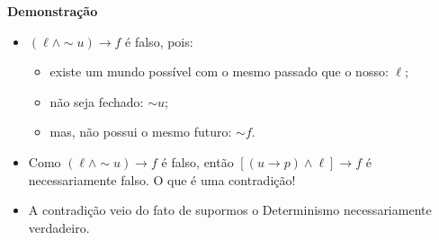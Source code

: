 \begin{frame}{\textbf{Demonstração}}
	
	\begin{itemize}
		\item<17->[$\bullet$] $(\ell \wedge \sim\! u ) \rightarrow f$ é falso, pois:
		 \begin{itemize}
		     \item<18-|alert@18> existe um mundo possível com o mesmo passado que o nosso: $\ell$;
			 \item<19-|alert@19> não seja fechado: $\sim\! u$;
			 \item<20-|alert@20> mas, não possui o mesmo futuro: $\sim\! f$.
		 \end{itemize}
		\item<21->[$\bullet$] Como $(\ell \wedge \sim\! u) \rightarrow f$ é falso, então
			$[(u\rightarrow p) \wedge \ell]\rightarrow f$ é necessariamente falso.
			O que é uma contradição!
		\item<22-> A contradição veio do fato de supormos o Determinismo necessariamente
		verdadeiro.
	\end{itemize}
\end{frame}

